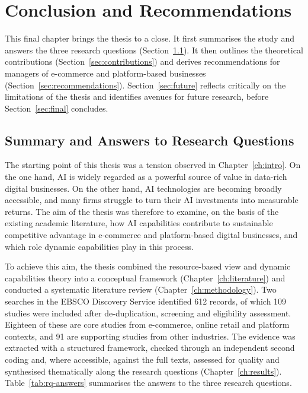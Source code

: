 
\chapter{Conclusion and Recommendations}
\label{ch:conclusion}

This final chapter brings the thesis to a close. It first summarises the study and answers the three research questions (Section~\ref{sec:summary}). It then outlines the theoretical contributions (Section~\ref{sec:contributions}) and derives recommendations for managers of e-commerce and platform-based businesses (Section~\ref{sec:recommendations}). Section~\ref{sec:future} reflects critically on the limitations of the thesis and identifies avenues for future research, before Section~\ref{sec:final} concludes.

\section{Summary and Answers to Research Questions}
\label{sec:summary}

The starting point of this thesis was a tension observed in Chapter~\ref{ch:intro}. On the one hand, AI is widely regarded as a powerful source of value in data-rich digital businesses. On the other hand, AI technologies are becoming broadly accessible, and many firms struggle to turn their AI investments into measurable returns. The aim of the thesis was therefore to examine, on the basis of the existing academic literature, how AI capabilities contribute to sustainable competitive advantage in e-commerce and platform-based digital businesses, and which role dynamic capabilities play in this process.

To achieve this aim, the thesis combined the resource-based view and dynamic capabilities theory into a conceptual framework (Chapter~\ref{ch:literature}) and conducted a systematic literature review (Chapter~\ref{ch:methodology}). Two searches in the EBSCO Discovery Service identified 612 records, of which 109 studies were included after de-duplication, screening and eligibility assessment. Eighteen of these are core studies from e-commerce, online retail and platform contexts, and 91 are supporting studies from other industries. The evidence was extracted with a structured framework, checked through an independent second coding and, where accessible, against the full texts, assessed for quality and synthesised thematically along the research questions (Chapter~\ref{ch:results}). Table~\ref{tab:rq-answers} summarises the answers to the three research questions.

